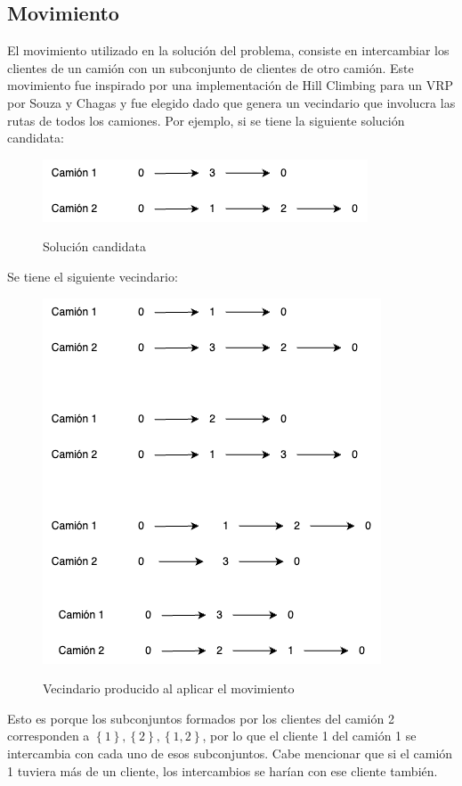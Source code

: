 \documentclass{article}
\begin{document}
\subsection{Movimiento}
El movimiento utilizado en la solución del problema, consiste en intercambiar los clientes de un camión con un subconjunto de clientes de otro camión. Este movimiento fue inspirado por una implementación de Hill Climbing para un VRP por Souza y Chagas \cite{souza2020late} y fue elegido dado que genera un vecindario que involucra las rutas de todos los camiones. Por ejemplo, si se tiene la siguiente solución candidata:

\begin{figure}[H]
    \includegraphics[scale = 0.5]{images/sol.png}
    \label{fig: candidatesol}
    \caption{Solución candidata}
\end{figure}

Se tiene el siguiente vecindario:
\begin{figure}[H]
    \includegraphics[scale = 0.5]{images/vecindario.png}
    \label{fig: neighborhood}
    \caption{Vecindario producido al aplicar el movimiento}
\end{figure}

Esto es porque los subconjuntos formados por los clientes del camión 2 corresponden a $\left\{1\right\}, \left\{2\right\}, \left\{1,2\right\}$, por lo que el cliente 1 del camión 1 se intercambia con cada uno de esos subconjuntos. Cabe mencionar que si el camión 1 tuviera más de un cliente, los intercambios se harían con ese cliente también.
\end{document}
